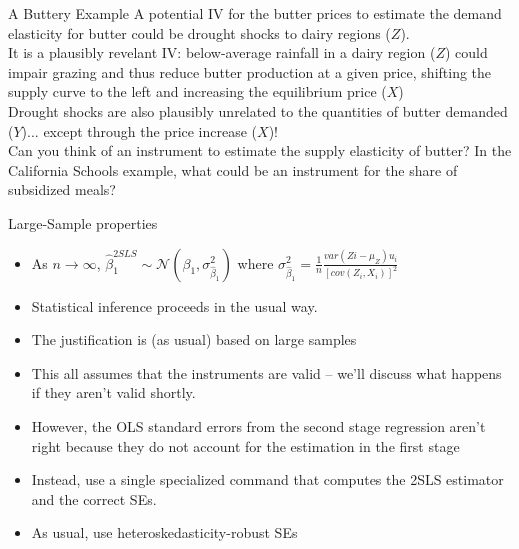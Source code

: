\documentclass[notes,10pt, aspectratio=169]{beamer}
\begin{document}
\begin{frame}{A Buttery Example}
A potential IV for the butter prices to estimate the demand elasticity for butter could be drought shocks to dairy regions ($Z$).\\[1em]
It is a plausibly revelant IV: below-average rainfall in a dairy region  ($Z$) could impair grazing and thus reduce butter production at a given price, shifting the supply curve to the left and increasing the equilibrium price  ($X$)\\[1em]
Drought shocks are also plausibly unrelated to the quantities of butter demanded  ($Y$)... except through the price increase ($X$)!\\[1em]
Can you think of an instrument to estimate the supply elasticity of butter? In the California Schools example, what could be an instrument for the share of subsidized meals?
\end{frame}

\begin{frame}{Large-Sample properties}
\begin{itemize}
    \item As $n\rightarrow\infty$, $\hat{\beta}_1^{2SLS}\sim\mathcal{N}(\beta_1, \sigma^2_{\hat{\beta}_1})$ where $\sigma^2_{\hat{\beta}_1}=\frac{1}{n}\frac{var(Zi-\mu_Z)u_i}{[cov(Z_i, X_i)]^2}$
    \item Statistical inference proceeds in the usual way.
    \item The justification is (as usual) based on large samples
    \item This all assumes that the instruments are valid -- we’ll discuss what happens if they aren’t valid shortly.
    \item However, the OLS standard errors from the second stage regression aren’t right because they do not account for the estimation in the first stage
    \item Instead, use a single specialized command that computes the 2SLS estimator and the correct SEs.
    \item As usual, use heteroskedasticity-robust SEs
\end{itemize}
\end{frame}
\end{document}
